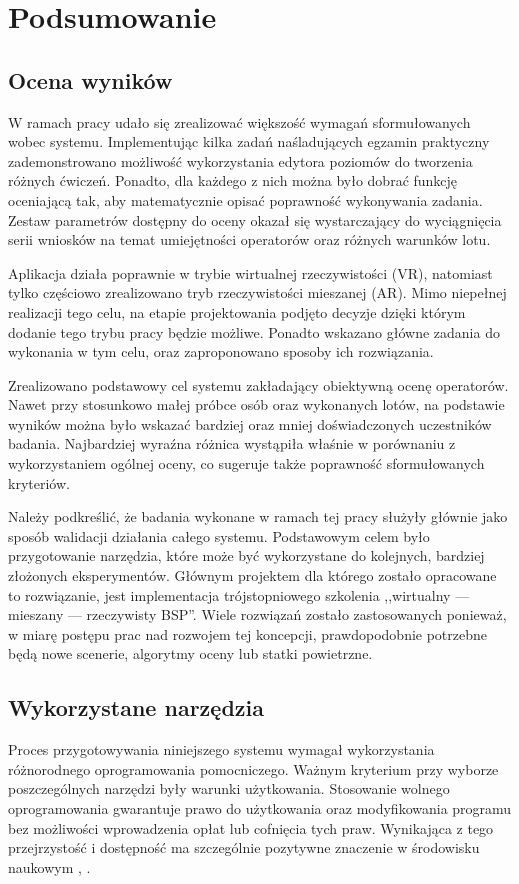 \newpage
\section{Podsumowanie}

\subsection{Ocena wyników}
W ramach pracy udało się zrealizować większość wymagań sformułowanych wobec systemu. Implementując kilka zadań naśladujących egzamin praktyczny zademonstrowano możliwość wykorzystania edytora poziomów do tworzenia różnych ćwiczeń. Ponadto, dla każdego z nich można było dobrać funkcję oceniającą tak, aby matematycznie opisać poprawność wykonywania zadania. Zestaw parametrów dostępny do oceny okazał się wystarczający do wyciągnięcia serii wniosków na temat umiejętności operatorów oraz różnych warunków lotu.

Aplikacja działa poprawnie w trybie wirtualnej rzeczywistości (VR), natomiast tylko częściowo zrealizowano tryb rzeczywistości mieszanej (AR). Mimo niepełnej realizacji tego celu, na etapie projektowania podjęto decyzje dzięki którym dodanie tego trybu pracy będzie możliwe. Ponadto wskazano główne zadania do wykonania w tym celu, oraz zaproponowano sposoby ich rozwiązania.

Zrealizowano podstawowy cel systemu zakładający obiektywną ocenę operatorów. Nawet przy stosunkowo małej próbce osób oraz wykonanych lotów, na podstawie wyników można było wskazać bardziej oraz mniej doświadczonych uczestników badania. Najbardziej wyraźna różnica wystąpiła właśnie w porównaniu z wykorzystaniem ogólnej oceny, co sugeruje także poprawność sformułowanych kryteriów.

Należy podkreślić, że badania wykonane w ramach tej pracy służyły głównie jako sposób walidacji działania całego systemu. Podstawowym celem było przygotowanie narzędzia, które może być wykorzystane do kolejnych, bardziej złożonych eksperymentów. Głównym projektem dla którego zostało opracowane to rozwiązanie, jest implementacja trójstopniowego szkolenia ,,wirtualny --- mieszany --- rzeczywisty BSP''. Wiele rozwiązań zostało zastosowanych ponieważ, w miarę postępu prac nad rozwojem tej koncepcji, prawdopodobnie potrzebne będą nowe scenerie, algorytmy oceny lub statki powietrzne.

\subsection{Wykorzystane narzędzia}
Proces przygotowywania niniejszego systemu wymagał wykorzystania różnorodnego oprogramowania pomocniczego. Ważnym kryterium przy wyborze poszczególnych narzędzi były warunki użytkowania. Stosowanie wolnego oprogramowania gwarantuje prawo do użytkowania oraz modyfikowania programu bez możliwości wprowadzenia opłat lub cofnięcia tych praw. Wynikająca z tego przejrzystość i dostępność ma szczególnie pozytywne znaczenie w środowisku naukowym \cite{courant2006}, \cite{lakhan2008}.


